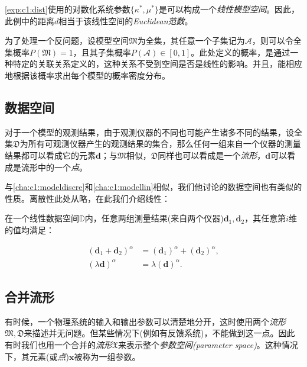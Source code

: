 \autoref{exp:c1:dist}使用的对数化系统参数$\{\kappa^{\ast}, \mu^{\ast}\}$是可以构成一个\emph{线性模型空间}。因此，此例中的距离$d$相当于该线性空间的\emph{\textit{Euclidean}范数}。

为了处理一个反问题，设模型空间$\mathfrak{M}$为全集，其任意一个子集记为$\mathcal{A}$，则可以令全集概率$P(\mathfrak{M})=1$，且其子集概率$P(\mathcal{A})\in [0,1]$。此处定义的概率，是通过一种特定的关联关系定义的，这种关系不受到空间是否是线性的影响。并且，能相应地根据该概率求出每个模型的概率密度分布。

\subsection{数据空间}

对于一个模型的观测结果，由于观测仪器的不同也可能产生诸多不同的结果，设全集$\mathfrak{D}$为所有可观测仪器产生的观测结果的集合，那么任何一组来自一个仪器的测量结果都可以看成它的元素$\mathbf{d}$；与$\mathfrak{M}$相似，$\mathfrak{D}$同样也可以看成是一个\emph{流形}，$\mathbf{d}$可以看成是流形中的一个\emph{点}。

与\autoref{cha:c1:modeldiscre}和\autoref{cha:c1:modellin}相似，我们他讨论的数据空间也有类似的性质。离散性此处从略，在此我们介绍线性：

\begin{character}[线性] \label{cha:c1:datalin}
  
  在一个线性数据空间$\mathbb{D}$内，任意两组测量结果(来自两个仪器)$\mathbf{d}_1,\mathbf{d}_2$，其任意第$i$维的值均满足：
  
  \begin{align} 
    (\mathbf{d}_1+\mathbf{d}_2)^{\alpha} &= (\mathbf{d}_1)^{\alpha} + (\mathbf{d}_2)^{\alpha}, \label{fml:c1:datalinearity1} \\
    (\lambda \mathbf{d})^{\alpha} &= \lambda(\mathbf{d})^{\alpha}.\label{fml:c1:datalinearity2}
  \end{align}
  
\end{character}

\subsection{合并流形}

有时候，一个物理系统的输入和输出参数可以清楚地分开，这时使用两个\emph{流形}~$\mathfrak{M},\mathfrak{D}$来描述并无问题。但某些情况下(例如有反馈系统)，不能做到这一点。因此有时我们也用一个合并的\emph{流形}$\mathfrak{X}$来表示整个\emph{参数空间(parameter space)}。这种情况下，其元素(或\emph{点})$\mathbf{x}$被称为一组参数。

